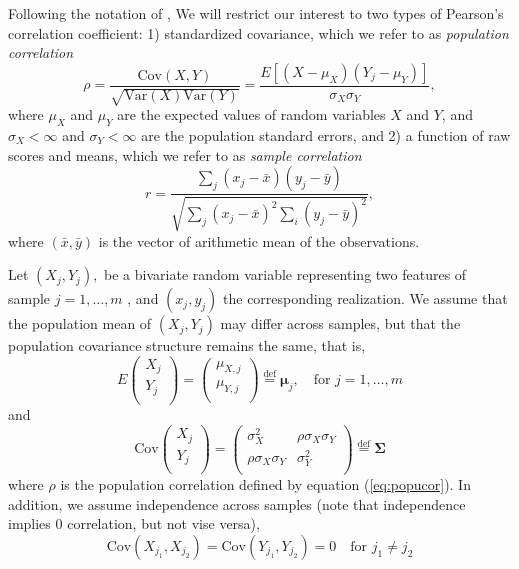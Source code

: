\documentclass[12pt, a4paper]{article}
\newcommand{\cov}{\text{Cov}}
\newcommand{\var}{\text{Var}}
\newcommand{\samplecor}{sample correlation}
\newcommand{\popucor}{population correlation}
\begin{document}
	Following the notation of 
	\citet{lee1988thirteen}, We will restrict our interest to two 
	types of Pearson's correlation coefficient: 1) standardized covariance, which we refer to as 
	\textit{\popucor}
	\begin{equation}\label{eq:popucor}
	\rho =\dfrac{\cov(X, Y)}{\sqrt{\var(X)\var(Y)}} = 
	\dfrac{E[(X-\mu_X)(Y_j-\mu_Y)]}{\sigma_X\sigma_Y}, 
	\end{equation} 	where $\mu_X$ and $\mu_Y$ are the expected values of random variables $X$ and 
	$Y$,  and $\sigma_X<\infty$ and 
	$\sigma_Y<\infty$ are the population standard errors, and 2) a function of raw scores and 
	means, which we refer to as \textit{\samplecor}
	\begin{equation}\label{eq:samplecor}
	r  =  \dfrac{\sum_j (x_j -\bar{x})(y_j - \bar{y})}{\sqrt{\sum_{j}(x_j - \bar{x})^2\sum_i(y_j - 
	\bar{y})^2}}, 
	\end{equation}
	where $(\bar{x}, \bar{y})$ is the vector of arithmetic mean of the observations.
	
	
	Let $(X_j, Y_j),$ be a bivariate random variable representing two features of sample $j = 1, 
	\ldots, m$ , and $(x_j, y_j)$ the corresponding realization.
	We assume that the population mean of $(X_j, Y_j)$ may differ across samples, but that the 
	population covariance structure remains the 
	same, that is,  
	\begin{equation}\label{eq:meanstruct}
	E  \left(\begin{array}{c}
	X_j\\
	Y_j\\	
	\end{array} \right) 
	= 	\left(\begin{array}{c}
	\mu_{X,j}\\
	\mu_{Y,j}\\
	\end{array} \right)\stackrel{\text{def}}{=} \bm \mu_j,  \text{~~ for $j = 1, \ldots, m$}
	\end{equation}
	and 
	\begin{equation}\label{eq:covstruct}
	\cov\left(\begin{array}{c}
	X_j\\
	Y_j\\	
	\end{array} \right)	
	= \left(
	\begin{array}{cc}
	\sigma_X^2 &\rho \sigma_X\sigma_Y \\
	\rho \sigma_X \sigma_Y & 	\sigma_Y^2 \\
	\end{array} 
	\right)
	\stackrel{\text{def}}{=} \bm \Sigma 
	\end{equation}
	where $\rho$ is the population correlation defined by equation (\ref{eq:popucor}). In addition, 
	we assume independence across samples (note that independence implies 0 correlation, but not 
	vise versa), 
	\begin{equation}\label{eq:indepsamples}
	\cov(X_{j_1}, X_{j_2}) = \cov(Y_{j_1}, Y_{j_2}) = 0 \text{~~~for $j_1\neq j_2$}
	\end{equation}
	
\end{document}
